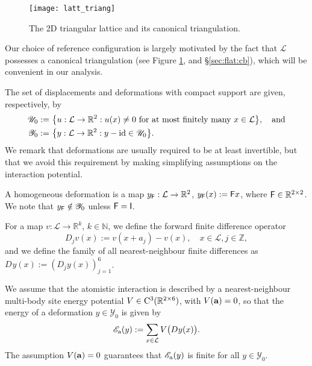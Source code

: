 \documentclass[12pt, reqno, a4paper]{amsart}
\numberwithin{equation}{section}
\numberwithin{theorem}{section}
\numberwithin{remark}{section}
\begin{document}
\begin{figure}
  \begin{center}
    \texttt{[image: latt\_triang]}
  \end{center}
  \caption{ \label{fig:lattice} The 2D triangular lattice and its
    canonical triangulation. }
\end{figure}

Our choice of reference configuration is largely motivated by the fact
that ${\mathcal{L}}$ possesses a canonical triangulation (see Figure
\ref{fig:lattice}, and \S\ref{sec:flat:cb}), which will be convenient
in our analysis.

The set of displacements and deformations with compact support are
given, respectively, by
\begin{align*}
  {\mathscr{U}}_0 :=~& \big\{ u : {\mathcal{L}} \to {\mathbb{R}}^2 : u(x) \neq 0  \text{ for at
    most finitely many } x \in {\mathcal{L}} \big\}, \quad \text{and} \\
  {\mathscr{Y}}_0 :=~& \big\{ y : {\mathcal{L}} \to {\mathbb{R}}^2 : y - {\rm id} \in {\mathscr{U}}_0 \big\}.
\end{align*}
We remark that deformations are usually required to be at least
invertible, but that we avoid this requirement by making simplifying
assumptions on the interaction potential.

A homogeneous deformation is a map ${y_{{\sf F}}} : {\mathcal{L}} \to {\mathbb{R}}^2$, ${y_{{\sf F}}}(x) := {{\sf F}}
x$, where ${{\sf F}} \in {\mathbb{R}}^{2 \times 2}$. We note that ${y_{{\sf F}}} \notin {\mathscr{Y}}_0$
unless ${{\sf F}} = {{\sf I}}$.

For a map $v : {\mathcal{L}}\to{\mathbb{R}}^k$, $k \in {\mathbb{N}}$, we define the forward finite
difference operator
\begin{displaymath}
{D_{{j}}} v(x) := v(x+ a_j) - v(x), \quad x \in {\mathcal{L}}, j \in {\mathbb{Z}},
\end{displaymath}
and we define the family of all nearest-neighbour finite differences
as ${D_{{}}}y(x) := ({D_{{j}}} y(x))_{j = 1}^6$.

We assume that the atomistic interaction is described by a
nearest-neighbour multi-body site energy potential $V \in {{\rm C}}^3({\mathbb{R}}^{2
  \times 6})$, with $V({\bf a}) = 0$, so that the energy of a
deformation $y \in {\mathscr{Y}}_0$ is given by
\begin{displaymath}
  
  {{\mathscr{E}}_{{\rm a}}}(y) := \sum_{x \in {\mathcal{L}}} V\big( {D_{{}}} y(x) \big).
\end{displaymath}
The assumption $V({\bf a}) = 0$ guarantees that ${{\mathscr{E}}_{{\rm a}}}(y)$ is finite for
all $y \in {\mathscr{Y}}_0$.
\end{document}
